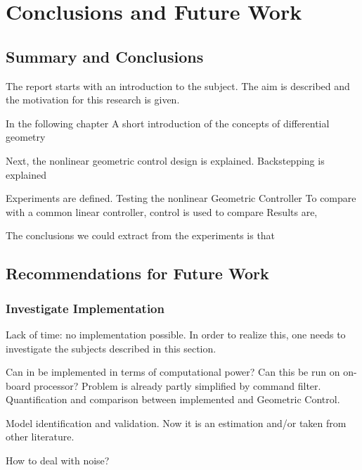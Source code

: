 \chapter{Conclusions and Future Work}\label{ch:conclusion}

\section{Summary and Conclusions}
The report starts with an introduction to the subject.
The aim is described and the motivation for this research is given.

In the following chapter
A short introduction of the concepts of differential geometry

Next, the nonlinear geometric control design is explained.
Backstepping is explained

Experiments are defined.
Testing the nonlinear Geometric Controller
To compare with a common linear controller,  control is used to compare
Results are,

The conclusions we could extract from the experiments is that

\section{Recommendations for Future Work}\label{ch:future}

\subsection{Investigate Implementation}
Lack of time: no implementation possible. In order to realize this, one needs to investigate the subjects described in this section.

Can in be implemented in terms of computational power? Can this be run on on-board processor?
Problem is already partly simplified by command filter. Quantification and comparison between implemented  and Geometric Control.

Model identification and validation. Now it is an estimation and/or taken from other literature.

How to deal with noise?



